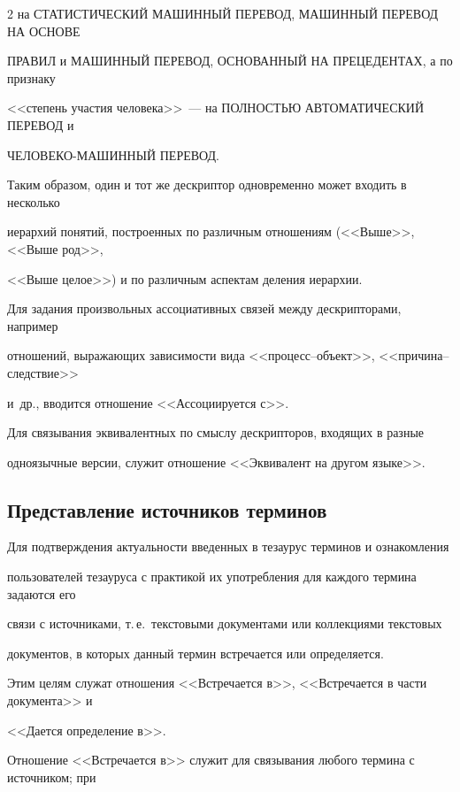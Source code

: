 \begin{multicols}{2}
на СТАТИСТИЧЕСКИЙ МАШИННЫЙ ПЕРЕВОД, МАШИННЫЙ ПЕРЕВОД НА ОСНОВЕ 

ПРАВИЛ и МАШИННЫЙ ПЕРЕВОД, ОСНОВАННЫЙ НА ПРЕЦЕДЕНТАХ, а по признаку 

<<степень участия человека>>~--- на ПОЛНОСТЬЮ АВТОМАТИЧЕСКИЙ ПЕРЕВОД и 

ЧЕЛОВЕКО-МАШИННЫЙ ПЕРЕВОД.

  

  Таким образом, один и тот же дескриптор одновременно может входить в несколько 

иерархий понятий, построенных по различным отношениям (<<Выше>>, <<Выше род>>, 

<<Выше целое>>) и по различным аспектам деления иерархии. 

  

  Для задания произвольных ассоциативных связей между дескрипторами, например 

отношений, выражающих зависимости вида <<процесс--объект>>, <<причина--следствие>> 

и~др., вводится отношение <<Ассоциируется с>>.

  

  Для связывания эквивалентных по смыслу дескрипторов, входящих в разные 

одноязычные версии, служит отношение <<Эквивалент на другом \mbox{языке}>>. 



\subsection{Представление источников терминов}



  Для подтверждения актуальности введенных в тезаурус терминов и ознакомления 

пользователей тезауруса с практикой их употребления для каждого термина задаются его 

связи с источниками, т.\,е.\ текстовыми документами или коллекциями текстовых 

документов, в которых данный термин встречается или определяется.

  

   Этим целям служат отношения <<Встречается в>>, <<Встречается в части документа>> и 

<<Дается определение в>>.

  

  Отношение <<Встречается в>> служит для связывания любого термина с источником; при 


\end{multicols}
